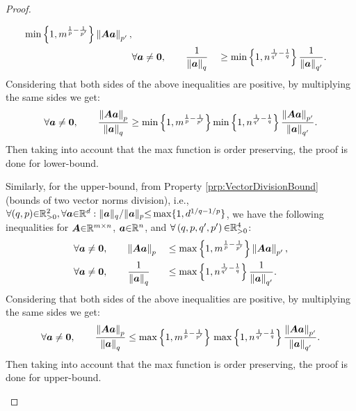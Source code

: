 \begin{proof}
\begin{itemize}
\begin{gather*}
\begin{aligned}
\min \left\lbrace 1 , m^{\frac1p - \frac{1}{p'}} \right\rbrace \left\lVert\boldsymbol{A} \boldsymbol{a}\right\rVert_{p'}, \\
&\forall \boldsymbol{a} \neq \boldsymbol{0}, \qquad \frac{1}{\left\lVert\boldsymbol{a}\right\rVert_q} &&\geq
\min \left\lbrace 1 , n^{\frac{1}{q'} - \frac1q} \right\rbrace \frac{1}{\left\lVert\boldsymbol{a}\right\rVert_{q'}}.
\end{aligned}
\end{gather*}
Considering that both sides of the above inequalities are positive, by multiplying the same sides we get:
\begin{gather*}
\forall \boldsymbol{a} \neq \boldsymbol{0}, \qquad \frac{\left\lVert\boldsymbol{A} \boldsymbol{a}\right\rVert_p}{\left\lVert\boldsymbol{a}\right\rVert_q} \geq
\min \left\lbrace 1 , m^{\frac1p - \frac{1}{p'}} \right\rbrace \min \left\lbrace 1 , n^{\frac{1}{q'} - \frac1q} \right\rbrace \frac{\left\lVert\boldsymbol{A} \boldsymbol{a}\right\rVert_{p'}}{\left\lVert\boldsymbol{a}\right\rVert_{q'}}.
\end{gather*}
Then taking into account that the max function is order preserving, the proof is done for lower-bound.

Similarly, for the upper-bound, from Property \ref{prp:VectorDivisionBound} (bounds of two vector norms division), i.e., $\forall (q , p) {\in} \mathbb{R}^2_{{>} 0} , \forall \boldsymbol{a} {\in} \mathbb{R}^d : \Vert \boldsymbol{a} \Vert_q / \Vert \boldsymbol{a} \Vert_p {\leq} \max \{1 , d^{1/q - 1/p} \}$, we have the following inequalities for $\boldsymbol{A} {\in} \mathbb{R}^{m {\times} n}$, $\boldsymbol{a} {\in} \mathbb{R}^n$, and $\forall \left( q , p , q' , p' \right) {\in} \mathbb{R}^4_{>0}$:
\begin{gather*}
\begin{aligned}
&\forall \boldsymbol{a} \neq \boldsymbol{0}, \qquad \left\lVert\boldsymbol{A} \boldsymbol{a}\right\rVert_p &&\leq
\max \left\lbrace 1 , m^{\frac1p - \frac{1}{p'}} \right\rbrace \left\lVert\boldsymbol{A} \boldsymbol{a}\right\rVert_{p'}, \\
&\forall \boldsymbol{a} \neq \boldsymbol{0}, \qquad \frac{1}{\left\lVert\boldsymbol{a}\right\rVert_q} &&\leq
\max \left\lbrace 1 , n^{\frac{1}{q'} - \frac1q} \right\rbrace \frac{1}{\left\lVert\boldsymbol{a}\right\rVert_{q'}}.
\end{aligned}
\end{gather*}
Considering that both sides of the above inequalities are positive, by multiplying the same sides we get:
\begin{gather*}
\forall \boldsymbol{a} \neq \boldsymbol{0}, \qquad \frac{\left\lVert\boldsymbol{A} \boldsymbol{a}\right\rVert_p}{\left\lVert\boldsymbol{a}\right\rVert_q} \leq
\max \left\lbrace 1 , m^{\frac1p - \frac{1}{p'}} \right\rbrace \, \max \left\lbrace 1 , n^{\frac{1}{q'} - \frac1q} \right\rbrace \frac{\left\lVert\boldsymbol{A} \boldsymbol{a}\right\rVert_{p'}}{\left\lVert\boldsymbol{a}\right\rVert_{q'}}.
\end{gather*}
Then taking into account that the max function is order preserving, the proof is done for upper-bound.


\end{itemize}
\end{proof}
